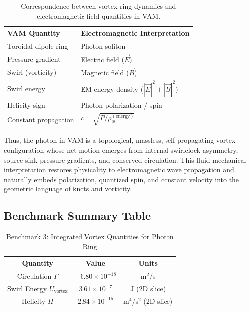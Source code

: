\begin{table}[H]
\centering
\renewcommand{\arraystretch}{1.3}
\begin{tabular}{ll}
\toprule
\textbf{VAM Quantity} & \textbf{Electromagnetic Interpretation} \\
\midrule
Toroidal dipole ring     & Photon soliton \\
Pressure gradient        & Electric field ($\vec{E}$) \\
Swirl (vorticity)        & Magnetic field ($\vec{B}$) \\
Swirl energy             & EM energy density ($|\vec{E}|^2 + |\vec{B}|^2$) \\
Helicity sign            & Photon polarization / spin \\
Constant propagation     & $c = \sqrt{P/\rho_\text{\ae}^{(\text{energy})}}$ \\
\bottomrule
\end{tabular}
\caption{Correspondence between vortex ring dynamics and electromagnetic field quantities in VAM.}
\end{table}

\vspace{1em}
\noindent
Thus, the photon in VAM is a topological, massless, self-propagating vortex configuration whose net motion emerges from internal swirlclock asymmetry, source-sink pressure gradients, and conserved circulation. This fluid-mechanical interpretation restores physicality to electromagnetic wave propagation and naturally embeds polarization, quantized spin, and constant velocity into the geometric language of knots and vorticity.

\subsection{Benchmark Summary Table}

\begin{table}[H]
\centering
\caption{Benchmark 3: Integrated Vortex Quantities for Photon Ring}
\begin{tabular}{|c|c|c|}
\hline
\textbf{Quantity} & \textbf{Value} & \textbf{Units} \\
\hline
Circulation $\Gamma$ & $-6.80 \times 10^{-18}$ & m$^2$/s \\
Swirl Energy $U_{\text{vortex}}$ & $3.61 \times 10^{-7}$ & J (2D slice) \\
Helicity $H$ & $2.84 \times 10^{-15}$ & m$^4$/s$^2$ (2D slice) \\
\hline
\end{tabular}
\end{table}

